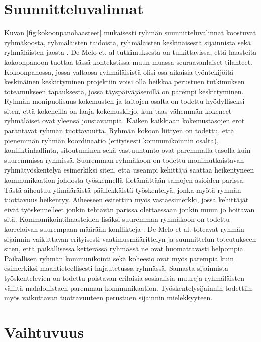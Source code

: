 \section{Suunnitteluvalinnat}

Kuvan \ref{fig:kokoonpanohaasteet} mukaisesti ryhmän suunnitteluvalinnat koostuvat ryhmäkoosta, ryhmäläisten taidoista, ryhmäläisten keskinäisestä sijainnista sekä ryhmäläisten jaosta \cite{DEOMELO2013412}. De Melo et. al \cite{DEOMELO2013412} tutkimuksesta on tulkittavissa, että haasteita kokoonpanoon tuottaa tässä kontekstissa muun muassa seuraavanlaiset tilanteet. Kokoonpanossa, jossa valtaosa ryhmäläisistä olisi osa-aikaisia työntekijöitä keskinäinen keskittyminen projektiin voisi olla heikkoa perustuen tutkimuksen toteamukseen tapauksesta, jossa täyspäiväjäsenillä on parempi keskittyminen. Ryhmän monipuolisuus kokemusten ja taitojen osalta on todettu hyödylliseksi siten, että kokeneilla on laaja kokemuskirjo, kun taas vähemmän kokeneet ryhmäläiset ovat yleensä joustavampia. Kaiken kaikkiaan kokemustasojen erot parantavat ryhmän tuottavuutta. Ryhmän kokoon liittyen on todettu, että pienemmän ryhmän koordinaatio (erityisesti kommunikoinnin osalta), konfliktinhallinta, sitoutuminen sekä vastuuntunto ovat paremmalla tasolla kuin suuremmissa ryhmissä. Suuremman ryhmäkoon on todettu monimutkaistavan ryhmätyöskentelyä esimerkiksi siten, että useampi kehittäjä saattaa heikentyneen kommunikaation johdosta työskennellä tietämättään samojen asioiden parissa. Tästä aiheutuu ylimääräistä päällekkäistä työskentelyä, jonka myötä ryhmän tuottavuus heikentyy. Aiheeseen esitettiin myös vastaesimerkki, jossa kehittäjät eivät työskennelleet jonkin tehtävän parissa olettaessaan jonkin muun jo hoitavan sitä. Kommunikointihaasteiden lisäksi suuremman ryhmäkoon on todettu korreloivan suurempaan määrään konflikteja \cite{DEOMELO2013412, SELLERISILVA201520}. De Melo et al. \cite{DEOMELO2013412} toteavat ryhmän sijainnin vaikuttavan erityisesti vaatimusmäärittelyn ja suunnittelun toteutukseen siten, että paikallisessa ketterässä ryhmässä ne ovat huomattavasti helpompia. Paikallisen ryhmän kommunikointi sekä koheesio ovat myös parempia kuin esimerkiksi maantieteellisesti hajautetussa ryhmässä. Samasta sijainnista työskentelevien on todettu poistavan erilaisia sosiaalisia muureja ryhmäläisten väliltä mahdollistaen paremman kommunikaation. Työskentelysijainnin todettiin myös vaikuttavan tuottavuuteen perustuen sijainnin mielekkyyteen.

\section{Vaihtuvuus}

